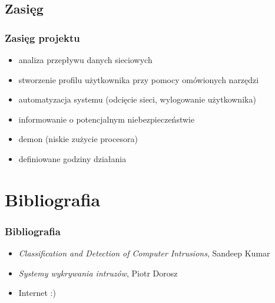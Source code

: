 \documentclass{beamer}
\begin{document}
\subsection{Zasięg}
\begin{frame}
  \frametitle{Zasięg projektu}
  \begin{itemize}
    \item analiza przepływu danych sieciowych
    \item stworzenie profilu użytkownika przy pomocy omówionych narzędzi
    \item automatyzacja systemu (odcięcie sieci, wylogowanie użytkownika)
    \item informowanie o potencjalnym niebezpieczeństwie
    \item demon (niskie zużycie procesora)
    \item definiowane godziny działania
  \end{itemize}
\end{frame}

\section{Bibliografia}

\begin{frame}
  \frametitle{Bibliografia}
  \begin{itemize}
    \item \textit{Classification and Detection of Computer Intrusions}, Sandeep Kumar
    \item \textit{Systemy wykrywania intruzów}, Piotr Dorosz
    \item Internet :)
  \end{itemize}
\end{frame}
\end{document}
